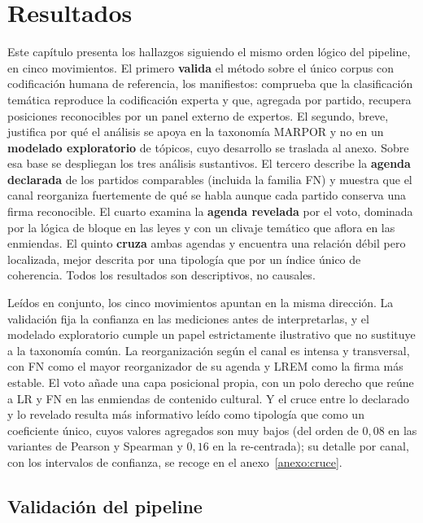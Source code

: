 \chapter{Resultados}
\label{cap:resultados}


Este capítulo presenta los hallazgos siguiendo el mismo orden lógico del
pipeline, en cinco movimientos. El primero \textbf{valida} el método sobre el
único corpus con codificación humana de referencia, los manifiestos: comprueba
que la clasificación temática reproduce la codificación experta y que, agregada
por partido, recupera posiciones reconocibles por un panel externo de expertos.
El segundo, breve, justifica por qué el análisis se apoya en la taxonomía MARPOR y
no en un \textbf{modelado exploratorio} de tópicos, cuyo desarrollo se traslada al
anexo. Sobre esa base se despliegan los tres análisis sustantivos. El tercero
describe la \textbf{agenda declarada} de los partidos comparables (incluida la
familia FN) y muestra que el canal reorganiza fuertemente de qué se habla
aunque cada partido conserva una firma reconocible. El cuarto examina la
\textbf{agenda revelada} por el voto, dominada por la lógica de bloque en las
leyes y con un clivaje temático que aflora en las enmiendas. El quinto
\textbf{cruza} ambas agendas y encuentra una relación débil pero localizada,
mejor descrita por una tipología que por un índice único de coherencia. Todos los
resultados son descriptivos, no causales.

Leídos en conjunto, los cinco movimientos apuntan en la misma dirección. La
validación fija la confianza en las mediciones antes de interpretarlas, y el
modelado exploratorio cumple un papel estrictamente ilustrativo que no sustituye
a la taxonomía común. La reorganización según el canal es intensa y transversal,
con FN como el mayor reorganizador de su agenda y LREM como la firma más estable.
El voto añade una capa posicional propia, con un polo derecho que reúne a LR y
FN en las enmiendas de contenido cultural. Y el cruce entre lo declarado y lo
revelado resulta más informativo leído como tipología que como un coeficiente
único, cuyos valores agregados son muy bajos (del orden de $0{,}08$ en las
variantes de Pearson y Spearman y $0{,}16$ en la re-centrada); su detalle por
canal, con los intervalos de confianza, se recoge en el
anexo~\ref{anexo:cruce}.

\section{Validación del pipeline}
\label{sec:res-validacion}

